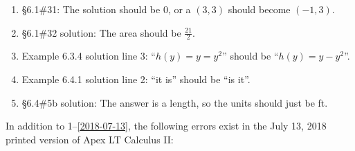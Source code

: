 \documentclass{amsart}
\begin{document}
\begin{enumerate}
\item \S6.1\#31: The solution should be 0, or a $(3,3)$ should become $(-1,3)$.
\item \S6.1\#32 solution: The area should be $\frac{21}2$.
\item Example 6.3.4 solution line 3: ``$h(y)=y=y^2$'' should be ``$h(y)=y-y^2$''.
\item Example 6.4.1 solution line 2: ``it is'' should be ``is it''.
\item \S6.4\#5b solution: The answer is a length, so the units should just be ft.
\label{2018-07-13I}
\end{enumerate}\bigskip


In addition to 1--\ref{2018-07-13}, the following errors exist in the July 13, 2018 printed version of Apex LT Calculus II:
\end{document}
